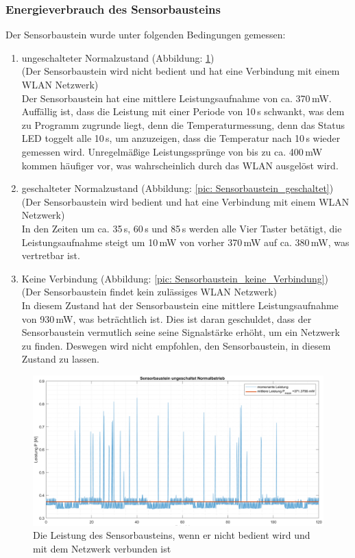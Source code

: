 \subsubsection{Energieverbrauch des Sensorbausteins}
Der Sensorbaustein wurde unter folgenden Bedingungen gemessen:
\begin{enumerate}
	\item ungeschalteter Normalzustand (Abbildung: \ref{pic: Sensorbaustein_ungeschaltet}) \\(Der Sensorbaustein wird nicht bedient und hat eine Verbindung mit einem WLAN Netzwerk) \\
	Der Sensorbaustein hat eine mittlere Leistungsaufnahme von ca. 370\,mW. Auffällig ist, dass die Leistung mit einer Periode von 10\,s schwankt, was dem zu Programm zugrunde liegt, denn die Temperaturmessung, denn das Status LED toggelt alle 10\,s, um anzuzeigen, dass die Temperatur nach 10\,s wieder gemessen wird. Unregelmäßige Leistungssprünge von bis zu ca. 400\,mW kommen häufiger vor, was wahrscheinlich durch das WLAN ausgelöst wird.
	\\
	\item geschalteter Normalzustand (Abbildung: \ref{pic: Sensorbaustein_geschaltet})\\ (Der Sensorbaustein wird bedient und hat eine Verbindung mit einem WLAN Netzwerk)\\
	In den Zeiten um ca. 35\,s, 60\,s und 85\,s werden alle Vier Taster betätigt, die Leistungsaufnahme steigt um 10\,mW von vorher 370\,mW auf ca. 380\,mW, was vertretbar ist.
	\\
	\item Keine Verbindung (Abbildung: \ref{pic: Sensorbaustein_keine_Verbindung})\\ (Der Sensorbaustein findet kein zulässiges WLAN Netzwerk)\\
	In diesem Zustand hat der Sensorbaustein eine mittlere Leistungsaufnahme von 930\,mW, was beträchtlich ist. Dies ist daran geschuldet, dass der Sensorbaustein vermutlich seine seine Signalstärke erhöht, um ein Netzwerk zu finden. Deswegen wird nicht empfohlen, den Sensorbaustein, in diesem Zustand zu lassen.
\end{enumerate}


\begin{figure}[H]
	\centering
	\includegraphics[width=1\textwidth]{graphics/Sensorbaustein_ungeschaltet.png}
	\caption{Die Leistung des Sensorbausteins, wenn er nicht bedient wird und mit dem Netzwerk verbunden ist}
	\label{pic: Sensorbaustein_ungeschaltet}
\end{figure}


